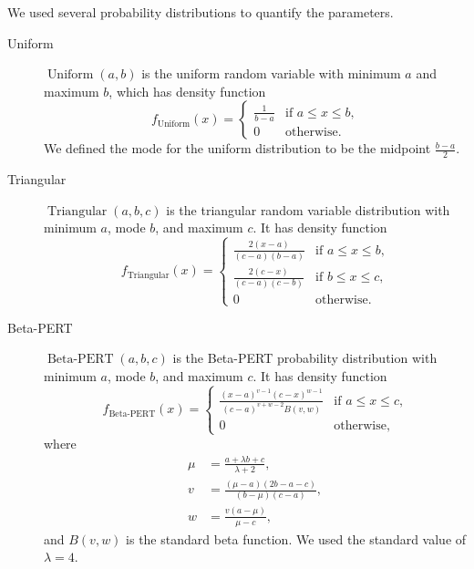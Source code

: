 \documentclass{article}
\DeclareMathOperator{\Uniform}{Uniform}
\DeclareMathOperator{\Triangular}{Triangular}
\DeclareMathOperator{\BetaPERT}{Beta-PERT}
\begin{document}
We used several probability distributions to quantify the parameters.
\begin{description}
\item[Uniform] $\Uniform(a, b)$ is the uniform random variable with
  minimum $a$ and maximum $b$, which has density function
  \begin{equation}
    \label{uniform}
    f_{\Uniform}(x) =
    \begin{cases}
      \frac{1}{b - a} & \text{if $a \leq x \leq b$,}
      \\
      0 & \text{otherwise.}
    \end{cases}
  \end{equation}
  We defined the mode for the uniform distribution to be the midpoint
  $\frac{b - a}{2}$.

\item [Triangular] $\Triangular(a, b, c)$ is the triangular random
  variable distribution with minimum $a$, mode $b$, and maximum $c$.
  It has density function
  \begin{equation}
    \label{triangular}
    f_{\Triangular}(x) =
    \begin{cases}
      \frac{2 (x - a)}{(c - a)(b - a)} & \text{if $a \leq x \leq b$,}
      \\
      \frac{2 (c - x)}{(c - a)(c - b)} & \text{if $b \leq x \leq c$,}
      \\
      0 & \text{otherwise.}
    \end{cases}
  \end{equation}

\item[Beta-PERT] $\BetaPERT(a, b, c)$ is the Beta-PERT probability
  distribution\cite{malcom1959} with minimum $a$, mode $b$, and
  maximum $c$.  It has density function
  \begin{equation}
    \label{BetaPERT}
    f_{\BetaPERT}(x) =
    \begin{cases}
      \frac{(x - a)^{v - 1} (c - x)^{w - 1}}{(c - a)^{v + w - 2} B(v, w)}
      & \text{if $a \leq x \leq c$,}
      \\
      0 & \text{otherwise,}
    \end{cases}
  \end{equation}
  where
  \begin{equation}
    \begin{split}
      \mu &= \frac{a + \lambda b + c}{\lambda + 2},
      \\
      v &= \frac{(\mu - a)(2 b - a - c)}{(b - \mu) (c - a)},
      \\
      w &= \frac{v (a - \mu)}{\mu - c},
    \end{split}
  \end{equation}
  and $B(v, w)$ is the standard beta function\cite{davis1972}.
  We used the standard value of $\lambda = 4$.


\end{description}
\end{document}

